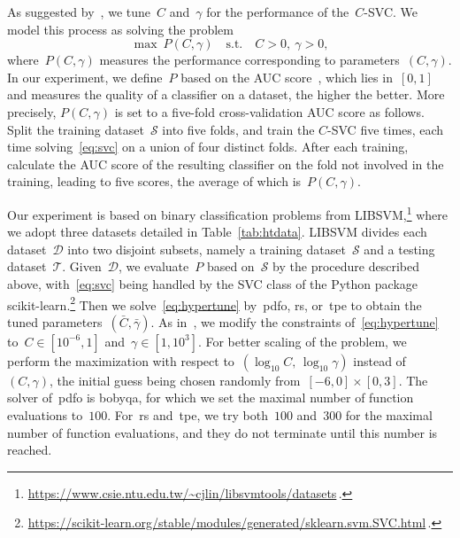 \documentclass[
    smallextended,  %
    draft,          %
    final,          %
]{svjour3}
\newcommand{\st}{\text{s.t.}}
\begin{document}
As suggested by~\cite[\S~9]{Chang_Lin_2011}, we tune~$C$ and~$\gamma$ for the performance of
the~$C$-SVC.
We model this process as solving the problem
\begin{equation}
    \label{eq:hypertune}
    \max ~ P(C, \gamma) \quad \st \quad C > 0,~ \gamma > 0,
\end{equation}
where~$P(C, \gamma)$ measures the performance corresponding to parameters~$(C, \gamma)$.
In our experiment,
we define~$P$ based on the AUC score~\cite[\S~3]{Ghanbari_Scheinberg_2017}, which lies in~$[0,1]$
and measures the quality of a classifier on a dataset, the higher the better.
More precisely, $P(C, \gamma)$ is set to a five-fold cross-validation AUC score as follows.
Split the training dataset~$\mathcal{S}$ into five folds, and train the $C$-SVC five times, each time
solving~\eqref{eq:svc} on a union
of four distinct folds.
After each training, calculate the AUC score of the resulting classifier
on the fold not involved in the training, leading to five scores, the average of which is~$P(C, \gamma)$.


Our experiment is based on binary classification problems from \mbox{LIBSVM},\footnote{\url{https://www.csie.ntu.edu.tw/~cjlin/libsvmtools/datasets}\,.}
where we adopt three datasets detailed in Table~\ref{tab:htdata}.
LIBSVM divides each dataset~$\mathcal{D}$ into two disjoint subsets, namely a training dataset~$\mathcal{S}$ and
a testing dataset~$\mathcal{T}$.
Given~$\mathcal{D}$, we evaluate~$P$ based on~$\mathcal{S}$ by the procedure
described above, with~\eqref{eq:svc} being handled by the SVC class of the Python package
\mbox{scikit-learn}.\footnote{\url{https://scikit-learn.org/stable/modules/generated/sklearn.svm.SVC.html}\,.}
Then we solve~\eqref{eq:hypertune} by~\gls{pdfo}, \gls{rs}, or~\gls{tpe} to obtain the tuned
parameters~$(\bar{C}, \bar{\gamma})$.
As in~\cite[\S~5.3]{Ghanbari_Scheinberg_2017}, we modify the constraints of~\eqref{eq:hypertune}
to~$C\in[10^{-6}, 1]$ and~$\gamma\in [1, 10^{3}]$.
For better scaling of the problem,
we perform the maximization with respect to~$(\log_{10}C,\, \log_{10}\gamma)$ instead of~$(C,
\gamma)$, the initial guess being chosen randomly from~$[-6, 0]\times[0, 3]$.
The solver
of~\gls{pdfo} is \gls{bobyqa}, for which we set the maximal number of function evaluations to~$100$.
For~\gls{rs} and~\gls{tpe}, we try both~$100$ and~$300$ for the maximal number of function
evaluations, and they do not terminate until this number is reached.
\end{document}
